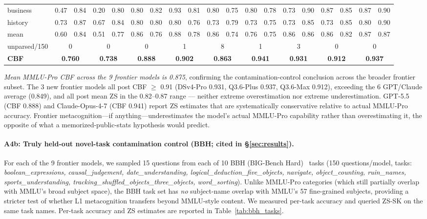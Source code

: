 \documentclass[11pt]{article}
\begin{document}
\begin{table}[h]
{\begin{tabular}{l rr rr rr rr rr rr rr rr rr}
business     & 0.47 & 0.84 & 0.20 & 0.80 & 0.80 & 0.82 & 0.93 & 0.81 & 0.80 & 0.75 & 0.80 & 0.78 & 0.73 & 0.90 & 0.87 & 0.85 & 0.87 & 0.90 \\
history      & 0.73 & 0.87 & 0.67 & 0.84 & 0.80 & 0.80 & 0.80 & 0.76 & 0.73 & 0.79 & 0.73 & 0.75 & 0.73 & 0.85 & 0.73 & 0.85 & 0.80 & 0.90 \\
\midrule
mean         & 0.60 & 0.84 & 0.51 & 0.77 & 0.86 & 0.76 & 0.88 & 0.78 & 0.86 & 0.74 & 0.76 & 0.75 & 0.86 & 0.86 & 0.86 & 0.82 & 0.87 & 0.87 \\
\midrule
unparsed/150 & \multicolumn{2}{c}{0} & \multicolumn{2}{c}{0} & \multicolumn{2}{c}{0} & \multicolumn{2}{c}{1} & \multicolumn{2}{c}{8} & \multicolumn{2}{c}{1} & \multicolumn{2}{c}{3} & \multicolumn{2}{c}{0} & \multicolumn{2}{c}{0} \\
\midrule
\textbf{CBF} & \multicolumn{2}{c}{\textbf{0.760}} & \multicolumn{2}{c}{\textbf{0.738}} & \multicolumn{2}{c}{\textbf{0.888}} & \multicolumn{2}{c}{\textbf{0.902}} & \multicolumn{2}{c}{\textbf{0.863}} & \multicolumn{2}{c}{\textbf{0.941}} & \multicolumn{2}{c}{\textbf{0.931}} & \multicolumn{2}{c}{\textbf{0.912}} & \multicolumn{2}{c}{\textbf{0.937}} \\
\bottomrule
\end{tabular}}
\end{table}

\emph{Mean MMLU-Pro CBF across the 9 frontier models is 0.875}, confirming the contamination-control conclusion across the broader frontier subset. The 3 new frontier models all post CBF $\geq$ 0.91 (DSv4-Pro 0.931, Q3.6-Plus 0.937, Q3.6-Max 0.912), exceeding the 6 GPT/Claude average (0.849), and all post mean ZS in the 0.82--0.87 range — neither extreme overestimation nor extreme underestimation. GPT-5.5 (CBF 0.888) and Claude-Opus-4-7 (CBF 0.941) report ZS estimates that are systematically conservative relative to actual MMLU-Pro accuracy. Frontier metacognition---if anything---underestimates the model's actual MMLU-Pro capability rather than overestimating it, the opposite of what a memorized-public-stats hypothesis would predict.


\paragraph{A4b: Truly held-out novel-task contamination control (BBH; cited in \S\ref{sec:results}).}
\label{app:heldout_bbh}
For each of the 9 frontier models, we sampled 15 questions from each of 10 BBH (BIG-Bench Hard)~\citep{suzgun2022challenging} tasks (150 questions/model, tasks: \emph{boolean\_expressions, causal\_judgement, date\_understanding, logical\_deduction\_five\_objects, navigate, object\_counting, ruin\_names, sports\_understanding, tracking\_shuffled\_objects\_three\_objects, word\_sorting}). Unlike MMLU-Pro categories (which still partially overlap with MMLU's broad subject space), the BBH task set has \emph{no} subject-name overlap with MMLU's 57 fine-grained subjects, providing a stricter test of whether L1 metacognition transfers beyond MMLU-style content. We measured per-task accuracy and queried ZS-SK on the same task names. Per-task accuracy and ZS estimates are reported in Table~\ref{tab:bbh_tasks}.
\end{document}
